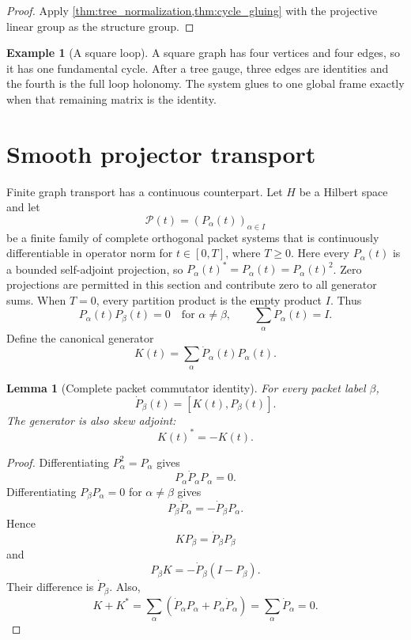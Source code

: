 \documentclass[11pt,a4paper]{article}
\theoremstyle{plain}
\newtheorem{lemma}[lemma]{Lemma}
\theoremstyle{definition}
\newtheorem{example}[example]{Example}
\theoremstyle{remark}
\newcommand{\Pcal}{\mathcal P}
\begin{document}
\begin{proof}
Apply \cref{thm:tree_normalization,thm:cycle_gluing} with the projective linear group as the structure group.
\end{proof}

\begin{example}[A square loop]\label{ex:square_loop}
A square graph has four vertices and four edges, so it has one fundamental cycle.  After a tree gauge, three edges are identities and the fourth is the full loop holonomy.  The system glues to one global frame exactly when that remaining matrix is the identity.
\end{example}

\section{Smooth projector transport}\label{sec:kato_transport}

Finite graph transport has a continuous counterpart.  Let $H$ be a Hilbert space and let
\[
\Pcal(t)=(P_\alpha(t))_{\alpha\in I}
\]
be a finite family of complete orthogonal packet systems that is continuously differentiable in operator norm for $t\in[0,T]$, where $T\ge0$. Here every $P_\alpha(t)$ is a bounded self-adjoint projection, so $P_\alpha(t)^*=P_\alpha(t)=P_\alpha(t)^2$. Zero projections are permitted in this section and contribute zero to all generator sums. When $T=0$, every partition product is the empty product $I$. Thus
\[
P_\alpha(t)P_\beta(t)=0
\quad\text{for }\alpha\ne\beta,
\qquad
\sum_\alpha P_\alpha(t)=I.
\]
Define the canonical generator
\[
K(t)=\sum_\alpha \dot P_\alpha(t)P_\alpha(t).
\]

\begin{lemma}[Complete packet commutator identity]\label{lem:packet_commutator}
For every packet label $\beta$,
\[
\dot P_\beta(t)=[K(t),P_\beta(t)].
\]
The generator is also skew adjoint:
\[
K(t)^*=-K(t).
\]
\end{lemma}

\begin{proof}
Differentiating $P_\alpha^2=P_\alpha$ gives
\[
P_\alpha\dot P_\alpha P_\alpha=0.
\]
Differentiating $P_\beta P_\alpha=0$ for $\alpha\ne\beta$ gives
\[
P_\beta\dot P_\alpha=-\dot P_\beta P_\alpha.
\]
Hence
\[
K P_\beta=\dot P_\beta P_\beta
\]
and
\[
P_\beta K=-\dot P_\beta(I-P_\beta).
\]
Their difference is $\dot P_\beta$.  Also,
\[
K+K^*
=
\sum_\alpha(\dot P_\alpha P_\alpha+P_\alpha\dot P_\alpha)
=
\sum_\alpha\dot P_\alpha
=0.
\]
\end{proof}
\end{document}
